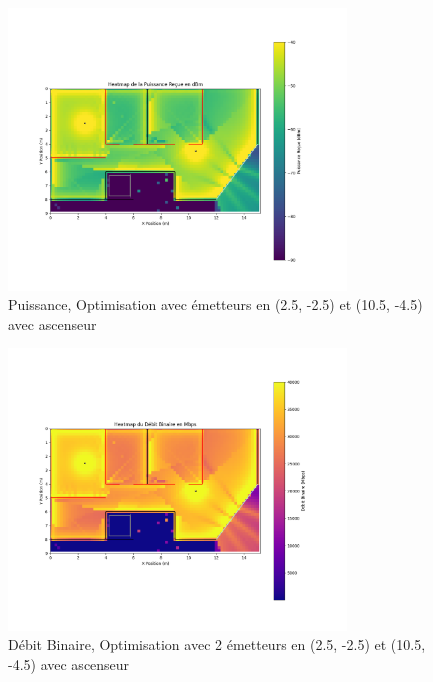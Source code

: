 \begin{figure}[H]
    \centering
    \includegraphics[width=0.8\textwidth]{Pictures/opti2dbma.png}
    \caption{Puissance, Optimisation avec  émetteurs en (2.5, -2.5) et (10.5, -4.5) avec ascenseur}
    \label{opti2dbma}
\end{figure}
\begin{figure}[H]
    \centering
    \includegraphics[width=0.8\textwidth]{Pictures/opti2mbpsa.png}
    \caption{Débit Binaire, Optimisation avec 2 émetteurs en (2.5, -2.5) et (10.5, -4.5) avec ascenseur}
    \label{opti2mbpsa}
\end{figure}
